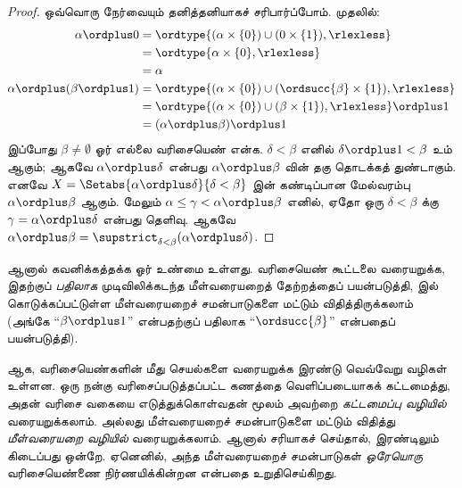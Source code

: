 \documentclass[../../../include/open-logic-section]{subfiles}
\begin{document}
\begin{proof}
ஒவ்வொரு நேர்வையும் தனித்தனியாகச் சரிபார்ப்போம். முதலில்:
\begin{align*}
  \alpha \ordplus  0
  & = \ordtype{(\alpha \times \{0\}) \cup (0 \times \{1\}), \rlexless} \\
  &= \ordtype{\alpha \times \{0\}, \rlexless}\\
  &= \alpha\\
  \alpha \ordplus (\beta \ordplus  1)
  &= \ordtype{(\alpha\times \{0\}) \cup (\ordsucc{\beta}\times \{1\}), \rlexless} \\
  &= \ordtype{(\alpha\times \{0\}) \cup (\beta \times \{1\}), \rlexless} \ordplus 1\\
  &= (\alpha \ordplus  \beta) \ordplus  1
\end{align*}
இப்போது $\beta \neq \emptyset$ ஓர் எல்லை வரிசையெண் என்க.
$\delta < \beta$ எனில் $\delta\ordplus 1 < \beta$ உம் ஆகும்;
ஆகவே $\alpha \ordplus  \delta$ என்பது $\alpha \ordplus  \beta$
வின் தகு தொடக்கத் துண்டாகும். எனவே
$X = \Setabs{\alpha \ordplus  \delta}{\delta < \beta}$ இன்
கண்டிப்பான மேல்வரம்பு $\alpha \ordplus  \beta$ ஆகும். மேலும்
$\alpha \leq \gamma < \alpha \ordplus  \beta$ எனில், ஏதோ ஒரு
$\delta < \beta$ க்கு $\gamma = \alpha \ordplus \delta$
என்பது தெளிவு. ஆகவே
$\alpha \ordplus  \beta =
\supstrict_{\delta< \beta}(\alpha\ordplus \delta)$.
\end{proof}

ஆனால் கவனிக்கத்தக்க ஓர் உண்மை உள்ளது. வரிசையெண் கூட்டலை வரையறுக்க,
இதற்குப் \emph{பதிலாக} முடிவிலிக்கடந்த மீள்வரையறைத் தேற்றத்தைப்
பயன்படுத்தி,  இல் கொடுக்கப்பட்டுள்ள
மீள்வரையறைச் சமன்பாடுகளை மட்டும் விதித்திருக்கலாம்
(அங்கே ``$\beta \ordplus 1$'' என்பதற்குப் பதிலாக
``$\ordsucc{\beta}$'' என்பதைப் பயன்படுத்தி).

ஆக, வரிசையெண்களின் மீது செயல்களை வரையறுக்க இரண்டு வெவ்வேறு வழிகள்
உள்ளன. ஒரு நன்கு வரிசைப்படுத்தப்பட்ட கணத்தை வெளிப்படையாகக்
கட்டமைத்து, அதன் வரிசை வகையை எடுத்துக்கொள்வதன் மூலம் அவற்றை
\emph{கட்டமைப்பு வழியில்} வரையறுக்கலாம். அல்லது மீள்வரையறைச்
சமன்பாடுகளை மட்டும் விதித்து \emph{மீள்வரையறை வழியில்}
வரையறுக்கலாம். ஆனால் சரியாகச் செய்தால், இரண்டிலும் கிடைப்பது ஒன்றே.
ஏனெனில், அந்த மீள்வரையறைச் சமன்பாடுகள் \emph{ஒரேயொரு}
வரிசையெண்ணை நிர்ணயிக்கின்றன என்பதை
 உறுதிசெய்கிறது.
\end{document}
